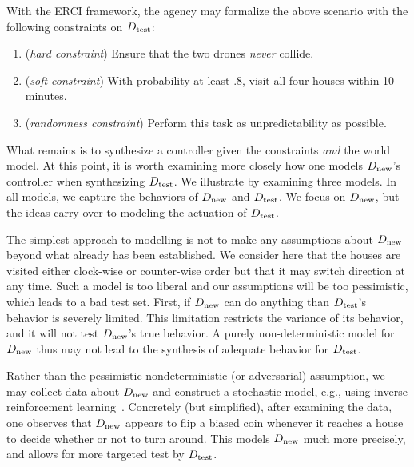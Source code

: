 With the ERCI framework, the agency may formalize the above scenario with the
following constraints on ${D_{\text{test}}}$:
\begin{enumerate}
\item (\emph{hard constraint}) Ensure that the two drones \emph{never} collide.
\item (\emph{soft constraint}) With probability at least $.8$, visit all four houses within 10 minutes.
\item (\emph{randomness constraint}) Perform this task as unpredictability as possible.
\end{enumerate}
What  remains is to synthesize a controller given the constraints
\emph{and} the world model. At this point, it is worth examining more
closely how one models ${D_{\text{new}}}$'s controller when synthesizing
${D_{\text{test}}}$. We illustrate by examining three models. In all models, we capture the behaviors of ${D_{\text{new}}}$ and ${D_{\text{test}}}$. We focus on ${D_{\text{new}}}$, but the ideas carry over to modeling the actuation of ${D_{\text{test}}}$.
%

The simplest approach to modelling is not to make any assumptions about  ${D_{\text{new}}}$ beyond what already has been established. We consider here that the houses are visited either clock-wise or counter-wise order but that it may switch direction at any time. 
Such a model is too liberal and our assumptions will be too pessimistic, which leads to a bad test set.
First, if ${D_{\text{new}}}$ can do anything than ${D_{\text{test}}}$'s behavior is severely limited. This limitation restricts the variance of its behavior, and it will not test ${D_{\text{new}}}$'s true behavior. 
A purely non-deterministic model for ${D_{\text{new}}}$ thus may not lead to the synthesis of adequate behavior for ${D_{\text{test}}}$. 

Rather than the pessimistic nondeterministic (or adversarial)  assumption, we may collect data about ${D_{\text{new}}}$ and construct a stochastic model, e.g., using inverse reinforcement learning~\cite{}.
Concretely (but simplified), after examining the data, one observes that ${D_{\text{new}}}$ appears
to flip a biased coin whenever it reaches a house to decide whether or
not to turn around. 
This models ${D_{\text{new}}}$ much more precisely, and allows for more targeted test by ${D_{\text{test}}}$.


